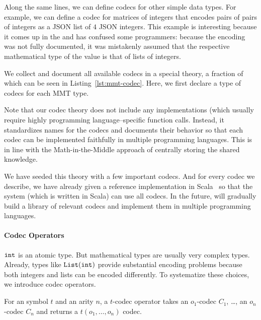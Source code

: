 Along the same lines, we can define codecs for other simple data types.
For example, we can define a codec for matrices of integers that encodes pairs of pairs of integers as a JSON list of $4$ JSON integers.
This example is interesting because it comes up in the \LMFDB and has confused some programmers: because the encoding was not fully documented, it was mistakenly assumed that the respective mathematical type of the value is that of lists of integers.




We collect and document all available codecs in a special \MMT theory, a fraction of which can be seen in Listing~\ref{lst:mmt-codec}.
Here, we first declare a type of codecs for each MMT type.

Note that our codec theory does not include any implementations (which usually require highly programming language--specific function calls.
Instead, it standardizes names for the codecs and documents their behavior so that each codec can be implemented faithfully in multiple programming languages.
This is in line with the Math-in-the-Middle approach of centrally storing the shared knowledge.

We have seeded this theory with a few important codecs.  And for every codec we describe,
we have already given a reference implementation in Scala~\cite{scala:webpage} so that the
\MMT system (which is written in Scala) can use all codecs.  In the future, \pn will
gradually build a library of relevant codecs and implement them in multiple programming
languages.

\paragraph{Codec Operators}
$\Int$ is an atomic type.
But mathematical types are usually very complex types.
Already, types like $\lst(\Int)$ provide substantial encoding problems because both integers and lists can be encoded differently.
To systematize these choices, we introduce codec operators.

\begin{mydef}
  For an \MMT symbol $t$ and an arity $n$, a $t$-codec operator takes an $o_1$-codec $C_1$, \ldots, an $o_n$-codec $C_n$ and returns a $t(o_1,\ldots,o_n)$ codec.
\end{mydef}

